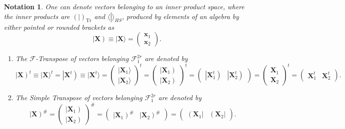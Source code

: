 \documentclass[aps, preprint]{revtex4}
\newtheorem{notation}[theorem]{Notation}
\begin{document}
\begin{notation}
One can denote vectors belonging to an inner product space, where the inner products are $\left (\left .\text{}\right \vert \right )_{\ensuremath{\operatorname*{Tr}}}$ and $ \langle \left .\text{}\right \vert  \rangle _{H S}\text{,}$ \emph{produced by} \emph{elements of an algebra} by either pointed or rounded brackets as
\begin{equation}\left \vert \mathbf{X}\right ) \equiv \vert \mathbf{X} \rangle  =\left (\begin{array}{c}\mathbf{x}_{1} \\
\mathbf{x}_{2}\end{array}\right )\text{.}
\end{equation}


\begin{enumerate}
\item The $\mathcal{F}$-\emph{Transpose} of vectors belonging $\mathcal{F}_{1}^{2 r}$ are denoted by
\begin{equation}\left \vert \mathbf{X}\right )^{t} \equiv \vert \mathbf{X} \rangle ^{t} =\left \vert \mathbf{X}^{t}\right ) \equiv \vert \mathbf{X}^{t} \rangle  =\left (\begin{array}{c}\vert \mathbf{X}_{1} \rangle  \\
\vert \mathbf{X}_{2} \rangle \end{array}\right )^{t} =\left (\begin{array}{c}\left \vert \mathbf{X}_{1}\right ) \\
\left \vert \mathbf{X}_{2}\right )\end{array}\right )^{t} =\left (\begin{array}{cc}\left \vert \mathbf{X}_{1}^{t}\right ) & \left \vert \mathbf{X}_{2}^{t}\right )\end{array}\right ) =\left (\begin{array}{c}\mathbf{X}_{1} \\
\mathbf{X}_{2}\end{array}\right )^{t} =\left (\begin{array}{cc}\mathbf{X}_{1}^{t} & \mathbf{X}_{2}^{t}\end{array}\right )\text{.}
\end{equation}

\item The \emph{Simple Transpose} of vectors belonging
$\mathcal{F}_{1}^{2 r}$ are denoted by
\begin{equation}\left \vert \mathbf{X}\right )^{\#} =\left (\begin{array}{c}\left \vert \mathbf{X}_{1}\right ) \\
\left \vert \mathbf{X}_{2}\right )\end{array}\right )^{\#} =\left (\begin{array}{cc}\left \vert \mathbf{X}_{1}\right )^{\#} & \left \vert \mathbf{X}_{2}\right )^{\#}\end{array}\right ) =\left (\begin{array}{cc}\left (\mathbf{X}_{1}\right \vert  & \left (\mathbf{X}_{2}\right \vert \end{array}\right )\text{.}
\end{equation}


\end{enumerate}
\end{notation}
\end{document}

